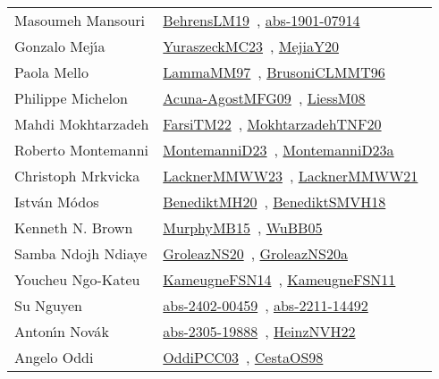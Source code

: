 {\begin{longtable}{p{4cm}p{20cm}}
Masoumeh Mansouri & \href{works/BehrensLM19.pdf}{BehrensLM19}~\cite{BehrensLM19}, \href{works/abs-1901-07914.pdf}{abs-1901-07914}~\cite{abs-1901-07914}\\
Gonzalo Mej{\'{\i}}a & \href{works/YuraszeckMC23.pdf}{YuraszeckMC23}~\cite{YuraszeckMC23}, \href{works/MejiaY20.pdf}{MejiaY20}~\cite{MejiaY20}\\
Paola Mello & \href{works/LammaMM97.pdf}{LammaMM97}~\cite{LammaMM97}, \href{works/BrusoniCLMMT96.pdf}{BrusoniCLMMT96}~\cite{BrusoniCLMMT96}\\
Philippe Michelon & \href{works/Acuna-AgostMFG09.pdf}{Acuna-AgostMFG09}~\cite{Acuna-AgostMFG09}, \href{works/LiessM08.pdf}{LiessM08}~\cite{LiessM08}\\
Mahdi Mokhtarzadeh & \href{}{FarsiTM22}~\cite{FarsiTM22}, \href{works/MokhtarzadehTNF20.pdf}{MokhtarzadehTNF20}~\cite{MokhtarzadehTNF20}\\
Roberto Montemanni & \href{works/MontemanniD23.pdf}{MontemanniD23}~\cite{MontemanniD23}, \href{works/MontemanniD23a.pdf}{MontemanniD23a}~\cite{MontemanniD23a}\\
Christoph Mrkvicka & \href{works/LacknerMMWW23.pdf}{LacknerMMWW23}~\cite{LacknerMMWW23}, \href{works/LacknerMMWW21.pdf}{LacknerMMWW21}~\cite{LacknerMMWW21}\\
Istv{\'{a}}n M{\'{o}}dos & \href{works/BenediktMH20.pdf}{BenediktMH20}~\cite{BenediktMH20}, \href{works/BenediktSMVH18.pdf}{BenediktSMVH18}~\cite{BenediktSMVH18}\\
Kenneth N. Brown & \href{works/MurphyMB15.pdf}{MurphyMB15}~\cite{MurphyMB15}, \href{works/WuBB05.pdf}{WuBB05}~\cite{WuBB05}\\
Samba Ndojh Ndiaye & \href{works/GroleazNS20.pdf}{GroleazNS20}~\cite{GroleazNS20}, \href{works/GroleazNS20a.pdf}{GroleazNS20a}~\cite{GroleazNS20a}\\
Youcheu Ngo{-}Kateu & \href{works/KameugneFSN14.pdf}{KameugneFSN14}~\cite{KameugneFSN14}, \href{works/KameugneFSN11.pdf}{KameugneFSN11}~\cite{KameugneFSN11}\\
Su Nguyen & \href{works/abs-2402-00459.pdf}{abs-2402-00459}~\cite{abs-2402-00459}, \href{works/abs-2211-14492.pdf}{abs-2211-14492}~\cite{abs-2211-14492}\\
Anton{\'{\i}}n Nov{\'{a}}k & \href{works/abs-2305-19888.pdf}{abs-2305-19888}~\cite{abs-2305-19888}, \href{works/HeinzNVH22.pdf}{HeinzNVH22}~\cite{HeinzNVH22}\\
Angelo Oddi & \href{works/OddiPCC03.pdf}{OddiPCC03}~\cite{OddiPCC03}, \href{works/CestaOS98.pdf}{CestaOS98}~\cite{CestaOS98}\\

\end{longtable}}
